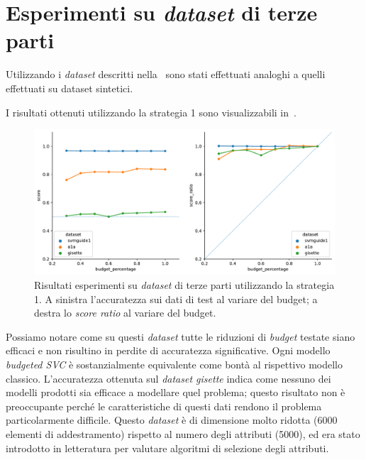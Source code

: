 \section{Esperimenti su \emph{dataset} di terze parti}\label{sec:exp:real_ds}
Utilizzando i \emph{dataset} descritti nella~ sono stati effettuati analoghi a quelli effettuati su dataset sintetici.

I risultati ottenuti utilizzando la strategia 1 sono visualizzabili in~.
\begin{figure}
    \centering
    \includegraphics[width=1\linewidth]{img//TP/tp_old_strategy.pdf}
    \caption[Risultati su \emph{dataset} di terze parti utilizzando la strategia 1.]{Risultati esperimenti su \emph{dataset} di terze parti utilizzando la strategia 1. A sinistra l'accuratezza sui dati di test al variare del budget; a destra lo \emph{score ratio} al variare del budget.}
    \label{fig:TP_old_strategy}
\end{figure}
Possiamo notare come su questi \emph{dataset} tutte le riduzioni di \emph{budget} testate siano efficaci e non risultino in perdite di accuratezza significative.
Ogni modello \emph{budgeted SVC} è sostanzialmente equivalente come bontà al rispettivo modello classico.
L'accuratezza ottenuta sul \emph{dataset gisette} indica come nessuno dei modelli prodotti sia efficace a modellare quel problema; questo risultato non è preoccupante perché le caratteristiche di questi dati rendono il problema particolarmente difficile.
Questo \emph{dataset} è di dimensione molto ridotta (6000 elementi di addestramento) rispetto al numero degli attributi (5000), ed era stato introdotto in letteratura per valutare algoritmi di selezione degli attributi. 

